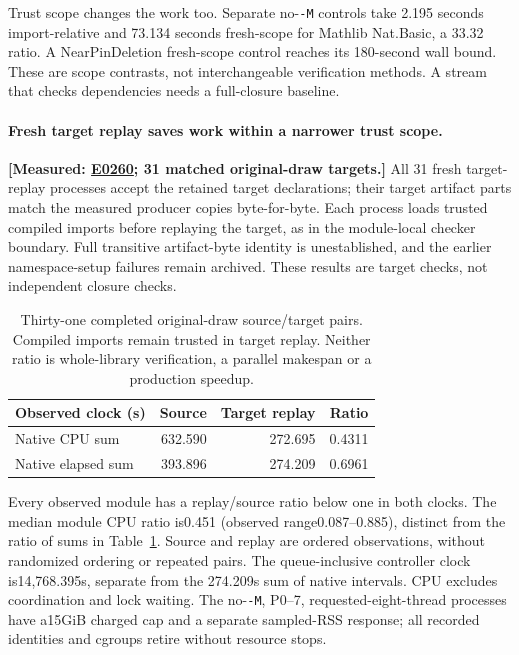 \documentclass[10pt,twocolumn]{article}
\newcommand{\measured}[1]{\textbf{[Measured: #1]}}
\newcommand{\expref}[2]{\href{https://github.com/yunwei37/proofserve/blob/main/docs/tmp/build-and-evaluate/step-#1/step-report.md}{E#2}}
\begin{document}
Trust scope changes the work too. Separate no-\texttt{-M} controls take
2.195 seconds import-relative and 73.134 seconds fresh-scope for Mathlib
Nat.Basic, a 33.32 ratio.
A NearPinDeletion fresh-scope control reaches its 180-second wall bound.
These are scope contrasts, not interchangeable verification methods.
A stream that checks dependencies needs a full-closure baseline.


\paragraph{Fresh target replay saves work within a narrower trust scope.}
\measured{\expref{0260-20261102T020415+0000}{0260}; 31 matched original-draw targets.}
All 31 fresh target-replay processes accept the retained target declarations;
their target artifact parts match the measured producer copies byte-for-byte.
Each process loads trusted compiled imports before replaying the target,
as in the module-local checker boundary. Full transitive artifact-byte
identity is unestablished, and the earlier namespace-setup failures remain
archived. These results are target checks, not independent closure checks.

\begin{table}[t]
\centering\small
\begin{tabular}{lrrr}
\toprule
Observed clock (s) & Source & Target replay & Ratio\\
\midrule
Native CPU sum &632.590&272.695&0.4311\\
Native elapsed sum &393.896&274.209&0.6961\\
\bottomrule
\end{tabular}
\caption{Thirty-one completed original-draw source/target pairs.
Compiled imports remain trusted in target replay. Neither ratio is
whole-library verification, a parallel makespan or a production speedup.}
\label{tab:target31}
\end{table}

Every observed module has a replay/source ratio below one in both clocks.
The median module CPU ratio is0.451 (observed range0.087--0.885), distinct from the ratio of sums
in Table~\ref{tab:target31}. Source and replay are ordered observations,
without randomized ordering or repeated pairs.
The queue-inclusive controller clock is14,768.395s, separate from the
274.209s sum of native intervals. CPU excludes coordination and lock waiting.
The no-\texttt{-M}, P0--7, requested-eight-thread processes have a15GiB
charged cap and a separate sampled-RSS response; all recorded identities
and cgroups retire without resource stops.
\end{document}

